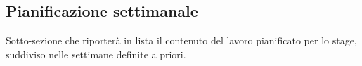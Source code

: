 \subsection{Pianificazione settimanale}

Sotto-sezione che riporterà in lista il contenuto del lavoro pianificato per lo stage, suddiviso nelle settimane definite a priori.